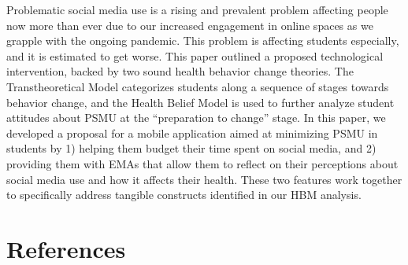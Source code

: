 \documentclass[
  man]{apa6}
\begin{document}
Problematic social media use is a rising and prevalent problem affecting people
now more than ever due to our increased engagement in online spaces as we grapple
with the ongoing pandemic. This problem is affecting students especially,
and it is estimated to get worse. This paper outlined a proposed technological
intervention, backed by two sound health behavior change theories. The
Transtheoretical Model categorizes students along a sequence of stages towards
behavior change, and the Health Belief Model is used to further analyze student
attitudes about PSMU at the ``preparation to change'' stage. In this paper,
we developed a proposal for a mobile application aimed at minimizing PSMU in
students by 1) helping them budget their time spent on social media, and 2)
providing them with EMAs that allow them to reflect on their perceptions about
social media use and how it affects their health. These two features work together
to specifically address tangible constructs identified in our HBM analysis.

\newpage

\hypertarget{references}{%
\section{References}\label{references}}
\end{document}
